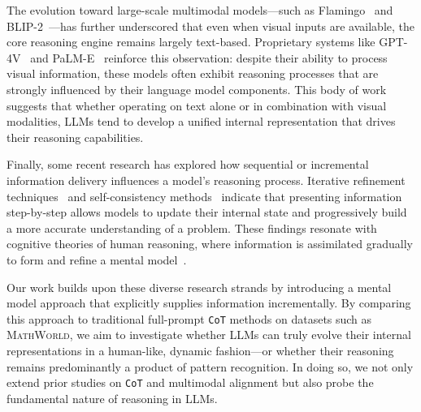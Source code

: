 The evolution toward large-scale multimodal models—such as Flamingo~\cite{alayrac2022flamingo} and BLIP-2~\cite{li2023blip}—has further underscored that even when visual inputs are available, the core reasoning engine remains largely text-based. Proprietary systems like GPT-4V~\cite{openai2024gpt4} and PaLM-E~\cite{driess2023palm} reinforce this observation: despite their ability to process visual information, these models often exhibit reasoning processes that are strongly influenced by their language model components. This body of work suggests that whether operating on text alone or in combination with visual modalities, LLMs tend to develop a unified internal representation that drives their reasoning capabilities.

Finally, some recent research has explored how sequential or incremental information delivery influences a model’s reasoning process. Iterative refinement techniques~\cite{nye2021show} and self-consistency methods~\cite{wang2023self} indicate that presenting information step-by-step allows models to update their internal state and progressively build a more accurate understanding of a problem. These findings resonate with cognitive theories of human reasoning, where information is assimilated gradually to form and refine a mental model~\cite{siegler}. 

Our work builds upon these diverse research strands by introducing a mental model approach that explicitly supplies information incrementally. By comparing this approach to traditional full-prompt \texttt{CoT} methods on datasets such as \textsc{MathWorld}, we aim to investigate whether LLMs can truly evolve their internal representations in a human-like, dynamic fashion—or whether their reasoning remains predominantly a product of pattern recognition. In doing so, we not only extend prior studies on \texttt{CoT} and multimodal alignment but also probe the fundamental nature of reasoning in LLMs.